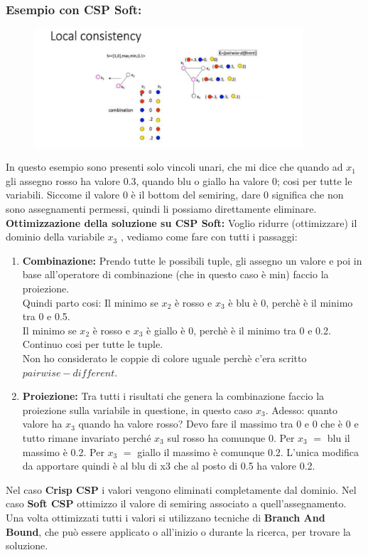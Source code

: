 \subsubsection{Esempio con CSP Soft:}
\begin{figure}[htp]
	\centering
    \includegraphics[width=10cm, keepaspectratio]{img/Cap5/LocalConsistency.png}
\end{figure}
In questo esempio sono presenti solo vincoli unari, che mi dice che quando ad $x_1$ gli assegno rosso ha valore 0.3, quando blu o giallo ha valore 0; cosi per tutte le variabili. Siccome il valore 0 è il bottom del semiring, dare 0 significa che non sono assegnamenti permessi, quindi li possiamo direttamente
eliminare.
\\
\textbf{Ottimizzazione della soluzione su CSP Soft: } Voglio ridurre (ottimizzare) il dominio della variabile $x_3$ , vediamo come fare con tutti i passaggi:
\begin{enumerate}
    \item \textbf{Combinazione:} Prendo tutte le possibili tuple, gli assegno un valore e poi in base all'operatore di combinazione (che in questo caso è min) faccio la proiezione.
    \\Quindi parto cosi:
    Il minimo se $x_2$ è rosso e $x_3$ è blu è 0, perchè è il minimo tra 0 e 0.5.
    \\Il minimo se $x_2$ è rosso e $x_3$ è giallo è 0, perchè è il minimo tra 0 e 0.2.
    \\Continuo cosi per tutte le tuple.
    \\Non ho considerato le coppie di colore uguale perchè c'era scritto $pairwise-different$.
    \item \textbf{Proiezione:} Tra tutti i risultati che genera la combinazione faccio la proiezione sulla variabile in questione, in questo caso $x_3$. Adesso: quanto valore ha $x_3$ quando ha valore rosso? Devo fare il massimo tra 0 e 0 che è 0 e tutto rimane invariato perché $x_3$ sul rosso ha comunque 0. Per $x_3$ $=$ blu il massimo è 0.2. Per $x_3$ $=$ giallo il massimo è comunque 0.2. L’unica modifica da apportare quindi è al blu di x3 che al posto di 0.5 ha valore 0.2.
\end{enumerate}
Nel caso \textbf{Crisp CSP} i valori vengono eliminati completamente dal dominio. Nel caso \textbf{Soft CSP} ottimizzo il valore di semiring associato a quell’assegnamento. Una volta ottimizzati tutti i valori si utilizzano tecniche di \textbf{Branch And Bound}, che può essere applicato o all’inizio o durante la ricerca, per trovare la soluzione.
\newpage
